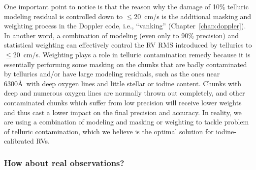 One important point to notice is that the reason why the damage of
10\% telluric modeling residual is controlled down to $\leq$20~cm/s is
the additional masking and weighting process in the Doppler code,
i.e., ``vanking'' (Chapter~\ref{chap:doppler}). In another word, a
combination of modeling (even only to 90\% precision) and statistical
weighting can effectively control the RV RMS introduced by tellurics
to $\leq$20~cm/s. Weighting plays a role in telluric contamination
remedy because it is essentially performing some masking on the
chunks that are badly contaminated by tellurics and/or have large
modeling residuals, such as the ones near 6300\AA\ with deep oxygen
lines and little stellar or iodine content. Chunks with deep and
numerous oxygen lines are normally thrown out completely, and other
contaminated chunks which suffer from low precision will receive lower
weights and thus cast a lower impact on the final precision and
accuracy. In reality, we are using a combination of modeling and
masking or weighting to tackle problem of telluric contamination,
which we believe is the optimal solution for iodine-calibrated RVs.


\subsubsection{How about real observations?}\label{keck:telluric:real}

